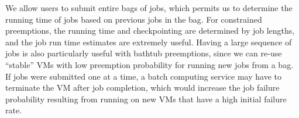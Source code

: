 We allow users to submit entire bags of jobs, which permits us to determine the running time of jobs based on previous jobs in the bag.
For constrained preemptions, the running time and checkpointing are determined by job lengths, and the job run time estimates are extremely useful. 
Having a large sequence of jobs is also particularly useful with bathtub preemptions, since we can re-use ``stable'' VMs with low preemption probability for running new jobs from a bag.
If jobs were submitted one at a time, a batch computing service may have to terminate the VM after job completion, which would increase the job failure probability resulting from running on new VMs that have a high initial failure rate. 












